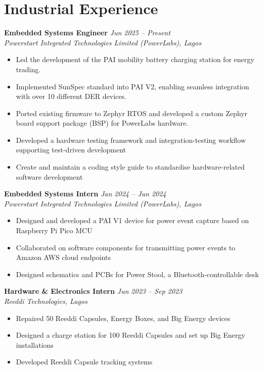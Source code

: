 \documentclass[10pt, a4paper]{article}
\newcommand{\cventry}[4]{%
  \noindent\textbf{#1} \hfill \textit{#2}\\%
  \textit{#3} \hfill \small{#4}\\[-4pt]%
}
\begin{document}
\section{Industrial Experience}

\cventry{Embedded Systems Engineer}{Jun 2025 -- Present}{Powerstart Integrated Technologies Limited (PowerLabs), Lagos}{}
\begin{itemize}
  \item Led the development of the PAI mobility battery charging station for energy trading.
  \item Implemented SunSpec standard into PAI V2, enabling seamless integration with over 10 different DER devices.
  \item Ported existing firmware to Zephyr RTOS and developed a custom Zephyr board support package (BSP) for PowerLabs hardware.
  \item Developed a hardware testing framework and integration-testing workflow supporting test-driven development
  \item Create and maintain a coding style guide to standardise hardware-related software development
\end{itemize}

\vspace{4pt}
\cventry{Embedded Systems Intern}{Jan 2024 -- Jun 2024}{Powerstart Integrated Technologies Limited (PowerLabs), Lagos}{}
\begin{itemize}
  \item Designed and developed a PAI V1 device for power event capture based on Raspberry Pi Pico MCU
  \item Collaborated on software components for transmitting power events to Amazon AWS cloud endpoints
  \item Designed schematics and PCBs for Power Stool, a Bluetooth-controllable desk
\end{itemize}

\vspace{4pt}
\cventry{Hardware \& Electronics Intern}{Jun 2023 -- Sep 2023}{Reeddi Technologies, Lagos}{}
\begin{itemize}
  \item Repaired 50 Reeddi Capsules, Energy Boxes, and Big Energy devices
  \item Designed a charge station for 100 Reeddi Capsules and set up Big Energy installations
  \item Developed Reeddi Capsule tracking systems
\end{itemize}
\end{document}
